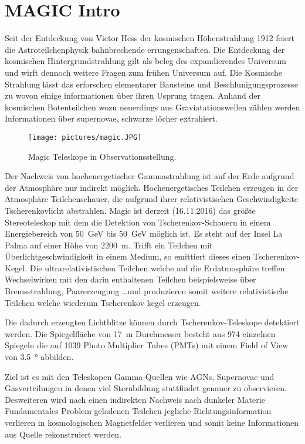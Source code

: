 \section{MAGIC Intro}%
\label{sec:magic}
Seit der Entdeckung von Victor Hess der kosmischen Höhenstrahlung 
1912 feiert die Astroteilchenphysik bahnbrechende errungenschaften.
Die Entdeckung der kosmischen Hintergrundstrahlung gilt als beleg des
expandierendes Universum und wirft dennoch weitere Fragen zum frühen Universum auf. 
Die Kosmische Strahlung lässt das erforschen elementarer Bausteine und
Beschlunigungsprozesse zu wovon
einige informationen über ihren Usprung tragen. 
Anhand der kosmischen Botenteilchen wozu neuerdings aus Graviatationswellen
zählen werden Informationen über supernovae, schwarze löcher extrahiert.
\begin{wrapfigure}[12]{o}{0.4\textwidth}
		\texttt{[image: pictures/magic.JPG]}
		\caption{Magic Teleskope in Observationsstellung.}
		\label{fig:magic}
\end{wrapfigure}
Der Nachweis von hochenergetischer Gammastrahlung ist auf der Erde aufgrund der
Atmosphäre nur indirekt möglich. 
Hochenergetisches Teilchen erzeugen in der Atmosphäre Teilchenschauer, die
aufgrund ihrer relativistischen Geschwindigkeite Tscherenkovlicht abstrahlen.
Magic ist derzeit (16.11.2016) das größte Stereoteleskop mit dem die
Detektion von Tscherenkov-Schauern in einem Energiebereich von
\SI{50}{\giga\electronvolt} bis \SI{50}{\giga\electronvolt} möglich ist.
Es steht auf der Insel La Palma auf einer Höhe von \SI{2200}{\meter}.
Trifft ein Teilchen mit Überlichtgeschwindigkeit in einem Medium, so emittiert
dieses einen Tscherenkov-Kegel. 
Die ultrarelativistischen Teilchen welche auf die Erdatmosphäre treffen
Wechselwirken mit den darin enthaltenen Teilchen beispielsweise über
Bremsstrahlung, Paarerzeugung \ldots und produzieren somit weitere
relativistische Teilchen welche wiederum Tscherenkov kegel erzeugen.

Die dadurch erzeugten Lichtblitze können durch Tscherenkov-Teleskope detektiert
werden.
Die Spiegelfläche von \SI{17}{\meter} Durchmesser besteht aus \num{974} einzelnen
Spiegeln die auf \num{1039} Photo Multiplier Tubes (PMTs) mit einem
Field of View von \SI{3.5}{\degree} abbilden. 

Ziel ist es mit den Teleskopen Gamma-Quellen wie AGNs, Supernovae und
Gasverteilungen in denen viel Sternbildung stattfindet genauer zu observieren. 
Desweiteren wird nach einen indirekten Nachweis nach dunkeler Materie 
Fundamentales Problem geladenen Teilchen jegliche Richtungsinformation verlieren
in kosmologischen Magnetfelder verlieren und somit keine Informationen aus
Quelle rekonstruiert werden. 

\clearpage
